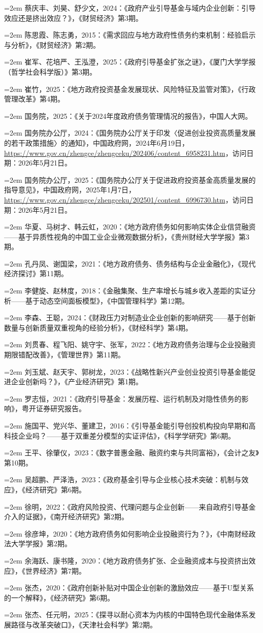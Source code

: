 \documentclass[UTF8,a4paper,zihao=5,fontset=fandol]{ctexart}
\newcommand{\ERJRef}[1]{%
  \par\noindent\hspace*{2em}\hangindent=2em\hangafter=1 {#1}\par%
}
\begin{document}
{\songti{}
\ERJRef{蔡庆丰、刘昊、舒少文，2024：《政府产业引导基金与域内企业创新：引导效应还是挤出效应？》，《财贸经济》第3期。}
\ERJRef{陈思霞、陈志勇，2015：《需求回应与地方政府性债务约束机制：经验启示与分析》，《财贸经济》第2期。}
\ERJRef{崔军、花培严、王泓澄，2025：《政府引导基金扩张之谜》，《厦门大学学报（哲学社会科学版）》第3期。}
\ERJRef{崔竹，2025：《地方政府投资基金发展现状、风险特征及监管对策》，《行政管理改革》第4期。}
\ERJRef{国务院，2025：《关于2024年度政府债务管理情况的报告》，中国人大网。}
\ERJRef{国务院办公厅，2024：《国务院办公厅关于印发〈促进创业投资高质量发展的若干政策措施〉的通知》，中国政府网，2024年6月19日，\url{https://www.gov.cn/zhengce/zhengceku/202406/content_6958231.htm}，访问日期：2026年5月21日。}
\ERJRef{国务院办公厅，2025：《国务院办公厅关于促进政府投资基金高质量发展的指导意见》，中国政府网，2025年1月7日，\url{https://www.gov.cn/zhengce/zhengceku/202501/content_6996730.htm}，访问日期：2026年5月21日。}
\ERJRef{华夏、马树才、韩云虹，2020：《地方政府债务如何影响实体企业信贷融资——基于异质性视角的中国工业企业微观数据分析》，《贵州财经大学学报》第3期。}
\ERJRef{孔丹凤、谢国梁，2021：《地方政府债务、债务结构与企业金融化》，《现代经济探讨》第11期。}
\ERJRef{李健旋、赵林度，2018：《金融集聚、生产率增长与城乡收入差距的实证分析——基于动态空间面板模型》，《中国管理科学》第12期。}
\ERJRef{李森、王聪，2024：《财政压力对制造业企业创新的影响研究——基于创新数量与创新质量双重视角的经验分析》，《财经科学》第4期。}
\ERJRef{刘贯春、程飞阳、姚守宇、张军，2022：《地方政府债务治理与企业投融资期限错配改善》，《管理世界》第11期。}
\ERJRef{刘玉斌、赵天宇、郭树龙，2023：《战略性新兴产业创业投资引导基金能促进企业创新吗？》，《产业经济研究》第1期。}
\ERJRef{罗志恒，2021：《政府引导基金：发展历程、运行机制及对隐性债务的影响》，粤开证券研究报告。}
\ERJRef{施国平、党兴华、董建卫，2016：《引导基金能引导创投机构投向早期和高科技企业吗？——基于双重差分模型的实证评估》，《科学学研究》第6期。}
\ERJRef{王平、徐肇仪，2023：《数字普惠金融、融资约束与共同富裕》，《会计之友》第10期。}
\ERJRef{吴超鹏、严泽浩，2023：《政府基金引导与企业核心技术突破：机制与效应》，《经济研究》第6期。}
\ERJRef{徐明，2022：《政府风险投资、代理问题与企业创新——来自政府引导基金介入的证据》，《南开经济研究》第2期。}
\ERJRef{徐彦坤，2020：《地方政府债务如何影响企业投融资行为？》，《中南财经政法大学学报》第2期。}
\ERJRef{余海跃、康书隆，2020：《地方政府债务扩张、企业融资成本与投资挤出效应》，《世界经济》第7期。}
\ERJRef{张杰，2020：《政府创新补贴对中国企业创新的激励效应——基于U型关系的一个解释》，《经济研究》第6期。}
\ERJRef{张杰、任元明，2025：《探寻以耐心资本为内核的中国特色现代金融体系发展路径与改革突破口》，《天津社会科学》第2期。}
}
\end{document}
